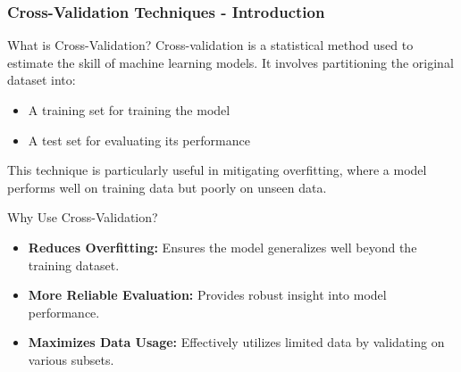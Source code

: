 \documentclass[aspectratio=169]{beamer}
\begin{document}
\begin{frame}[fragile]
    \frametitle{Cross-Validation Techniques - Introduction}
    \begin{block}{What is Cross-Validation?}
        Cross-validation is a statistical method used to estimate the skill of machine learning models. It involves partitioning the original dataset into:
        \begin{itemize}
            \item A training set for training the model
            \item A test set for evaluating its performance
        \end{itemize}
        This technique is particularly useful in mitigating overfitting, where a model performs well on training data but poorly on unseen data.
    \end{block}
    \begin{block}{Why Use Cross-Validation?}
        \begin{itemize}
            \item \textbf{Reduces Overfitting:} Ensures the model generalizes well beyond the training dataset.
            \item \textbf{More Reliable Evaluation:} Provides robust insight into model performance.
            \item \textbf{Maximizes Data Usage:} Effectively utilizes limited data by validating on various subsets.
        \end{itemize}
    \end{block}
\end{frame}
\end{document}
